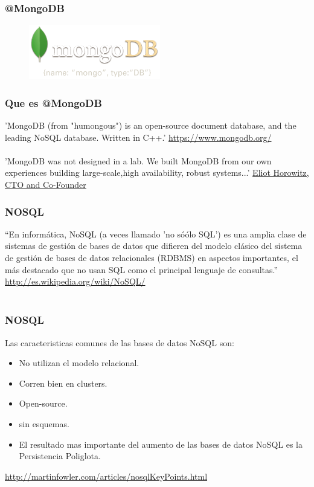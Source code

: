 \documentclass{beamer}
\begin{document}
\begin{frame}
\frametitle{@MongoDB}
\begin{figure}
\includegraphics[width=0.4\linewidth]{mongodb.png}
\end{figure}
\end{frame}
\begin{frame}
\frametitle{Que es @MongoDB}
'MongoDB (from "humongous") is an open-source document database, and the leading NoSQL database. Written in C++.'
{\color{blue}\url{https://www.mongodb.org/}}
\\~\\
'MongoDB was not designed in a lab. We built MongoDB from our own experiences building large-scale,high availability, robust systems...'
\underline{\color{green}Eliot Horowitz, CTO and Co-Founder}	
\end{frame}


\begin{frame}
\frametitle{NOSQL}
“En inform\'atica, NoSQL (a veces llamado 'no só\'olo SQL') es una amplia clase de sistemas de gesti\'on de bases de datos que difieren del modelo cl\'asico del sistema de gesti\'on de bases de datos relacionales (RDBMS) en aspectos importantes, el m\'as destacado que no usan SQL como el principal lenguaje de consultas.” {\color{blue}\url{http://es.wikipedia.org/wiki/NoSQL/}}
\\~\\

\end{frame}


\begin{frame}
\frametitle{NOSQL}
Las caracteristicas comunes de las bases de datos NoSQL son:
\begin{itemize}
\item No utilizan el modelo relacional.
\item Corren bien en clusters.
\item Open-source.
\item sin esquemas.
\item El resultado mas importante del aumento de las bases de datos NoSQL es la {\color{green}Persistencia Poliglota}.
\end{itemize}
{\color{blue}\url{http://martinfowler.com/articles/nosqlKeyPoints.html}}
\end{frame}
\end{document}
